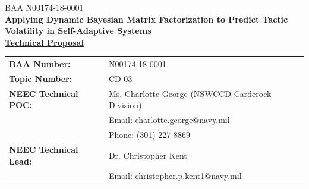 \documentclass[12pt]{article}
\newcommand{\Title}{Applying Dynamic Bayesian Matrix Factorization to Predict Tactic Volatility in Self-Adaptive Systems}
\newcommand{\CallNumber}{BAA N00174-18-0001}
\newcommand{\CallName}{XXXX}
\begin{document}
\begin{titlepage}

\newcommand{\HRule}{\rule{\linewidth}{0.3mm}} %




\noindent\large \CallNumber\\[.20cm] %


\noindent \LARGE \textbf{\Title}\\[.10cm] %

\noindent \large  \underline{\textbf{Technical Proposal}}\\ [.15cm] 

\begin{tabular}{ L{50mm} L{100mm} }



\normalsize \textbf{BAA Number:} & \normalsize  N00174-18-0001  \\



\normalsize \textbf{Topic Number:} & \normalsize  CD-03  \\ 
\normalsize \textbf{NEEC Technical POC:} & \normalsize  Ms. Charlotte George (NSWCCD Carderock Division)  \\
 & \normalsize  Email: charlotte.george@navy.mil  \\
 & \normalsize  Phone: (301) 227-8869  \\



\vspace{-0mm} \normalsize \textbf{NEEC Technical Lead:} & \normalsize  Dr. Christopher Kent  \\
 & \normalsize Email: christopher.p.kent1@navy.mil  \\



\end{tabular}
\end{titlepage}
\end{document}
